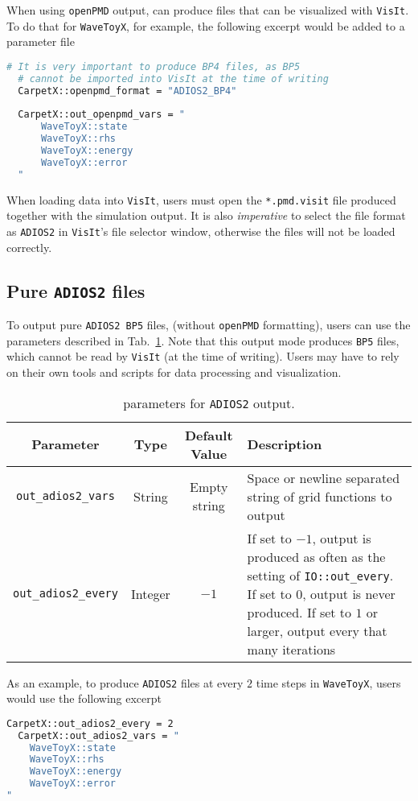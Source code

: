 When using \texttt{openPMD} output, \CarpetX can produce files that can be visualized with \texttt{VisIt}. To do that for \texttt{WaveToyX}, for example, the following excerpt would be added to a parameter file

\begin{lstlisting}[language=bash]
  # It is very important to produce BP4 files, as BP5
  # cannot be imported into VisIt at the time of writing
  CarpetX::openpmd_format = "ADIOS2_BP4"
  
  CarpetX::out_openpmd_vars = "
      WaveToyX::state
      WaveToyX::rhs
      WaveToyX::energy
      WaveToyX::error
  "
\end{lstlisting}

When loading data into \texttt{VisIt}, users must open the \texttt{*.pmd.visit} file produced together with the simulation output. It is also \textit{imperative} to select the file format as \texttt{ADIOS2} in \texttt{VisIt}'s file selector window, otherwise the files will not be loaded correctly.

\subsection{Pure \texttt{ADIOS2} files}

To output pure \texttt{ADIOS2 BP5} files, (without \texttt{openPMD} formatting), users can use the parameters described in Tab.~\ref{tab:adios2_params}. Note that this output mode produces \texttt{BP5} files, which cannot be read by \texttt{VisIt} (at the time of writing). Users may have to rely on their own tools and scripts for data processing and visualization.

\begin{table}[ht]
  \centering
  \begin{tabularx}{\textwidth}{cccX}
    Parameter                 & Type    & Default Value  & Description \\\hline\hline
    \texttt{out\_adios2\_vars}  & String  & Empty string   & Space or newline separated string of grid functions to output \\
    \texttt{out\_adios2\_every} & Integer & $-1$           & If set to $-1$, output is produced as often as the setting of \texttt{IO::out\_every}. If set to $0$, output is never produced. If set to $1$ or larger, output every that many iterations \\\hline\hline
  \end{tabularx}
  \label{tab:adios2_params}
  \caption{\CarpetX\space parameters for \texttt{ADIOS2} output.}
\end{table}

As an example, to produce \texttt{ADIOS2} files at every $2$ time steps in \texttt{WaveToyX}, users would use the following excerpt

\begin{lstlisting}[language=bash]
  CarpetX::out_adios2_every = 2
  CarpetX::out_adios2_vars = "
    WaveToyX::state
    WaveToyX::rhs
    WaveToyX::energy
    WaveToyX::error
"
\end{lstlisting}